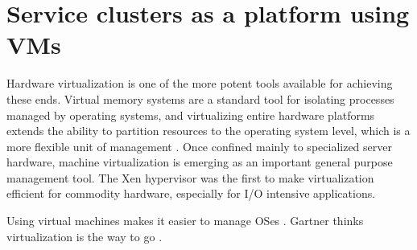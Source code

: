 \section{Service clusters as a platform using VMs}

Hardware virtualization is one of the more potent tools available for achieving these ends. Virtual memory systems are a standard tool for isolating processes managed by operating systems, and virtualizing entire hardware platforms extends the ability to partition resources to the operating system level, which is a more flexible unit of management \cite{hand}. Once confined mainly to specialized server hardware, machine virtualization is emerging as an important general purpose management tool. The Xen hypervisor \cite{barham} was the first to make virtualization efficient for commodity hardware, especially for I/O intensive applications.

Using virtual machines makes it easier to manage OSes \cite{chen}. Gartner thinks virtualization is the way to go \cite{bittman}.
